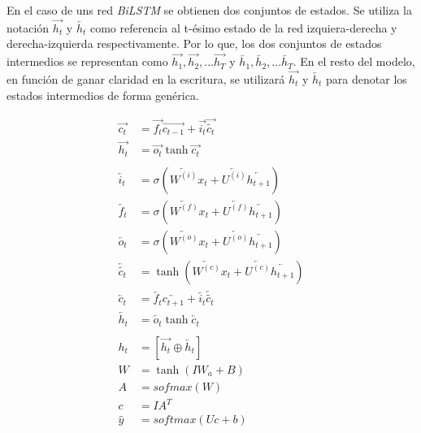 En el caso de uns red \textit{BiLSTM} se obtienen dos conjuntos de estados. Se utiliza la notación $\overrightarrow{h_{t}}$ y $\overleftarrow{h_{t}}$ como referencia al t-ésimo estado de la red izquiera-derecha y derecha-izquierda respectivamente. Por lo que, los dos conjuntos de estados intermedios se representan como $\overrightarrow{h_{1}}, \overrightarrow{h_{2}}, ... \overrightarrow{h_{T}}$ y $\overleftarrow{h_{1}}, \overleftarrow{h_{2}}, ... \overleftarrow{h_{T}}$. En el resto del modelo, en función de ganar claridad en la escritura, se utilizará $\overrightarrow{h_{t}}$ y  $\overleftarrow{h_{t}}$ para denotar los estados intermedios de forma genérica.

\begin{align}
  \overrightarrow{c_{t}} &= \overrightarrow{f_{t}}\overrightarrow{c_{t-1}} + \overrightarrow{i_{t}}\overrightarrow{\tilde{c_{t}}} \label{bilstm:cell_state} \\
  \overrightarrow{h_{t}} &= \overrightarrow{o_{t}}\tanh{\overrightarrow{c_{t}}} \label{bilstm:hidden_state}\\
  \nonumber \\
  \overleftarrow{i_{t}} &= \sigma{(\overleftarrow{W^{(i)}} x_{t} + \overleftarrow{U^{(i)}}\overleftarrow{h_{t+1}})} \label{bilstml:ig} \\
  \overleftarrow{f_{t}} &= \sigma{(\overleftarrow{W^{(f)}} x_{t} + \overleftarrow{U^{(f)}}\overleftarrow{h_{t+1}})} \label{bilstml:fg} \\
  \overleftarrow{o_{t}} &= \sigma{(\overleftarrow{W^{(o)}} x_{t} + \overleftarrow{U^{(o)}}\overleftarrow{h_{t+1}})} \label{bilstml:og} \\
  \overleftarrow{\tilde{c_{t}}} &= \tanh(\overleftarrow{W^{(c)}} x_{t} + \overleftarrow{U^{(c)}}\overleftarrow{h_{t+1}}) \label{bilstml:new_memory_cell} \\
  \overleftarrow{c_{t}} &= \overleftarrow{f_{t}}\overleftarrow{c_{t+1}} + \overleftarrow{i_{t}}\overleftarrow{\tilde{c_{t}}} \label{bilstml:cell_state} \\
  \overleftarrow{h_{t}} &= \overleftarrow{o_{t}}\tanh{\overleftarrow{c_{t}}} \label{bilstml:hidden_state}\\
  \nonumber \\
  h_{t} &= [\overrightarrow{h_{t}} \oplus \overleftarrow{h_{t}}] \label{bilstm:concat} \\
  W &= \tanh{(IW_{a} + B)} \label{bilstm:dense} \\
  A &= sofmax(W) \label{bilstm:sig} \\
  c &= IA^{T} \label{bilstm:dot} \\
  \hat{y} &= softmax(Uc + b) \label{bilstm:pred}
\end{align}

